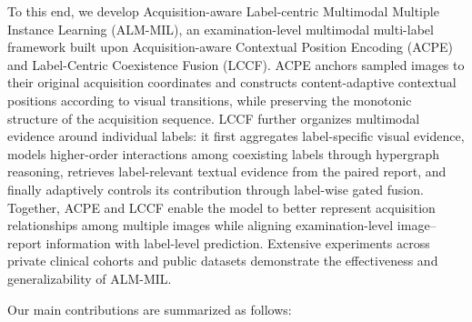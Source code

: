  To this end, we develop Acquisition-aware Label-centric Multimodal Multiple Instance Learning (ALM-MIL), an examination-level multimodal multi-label framework built upon Acquisition-aware Contextual Position Encoding (ACPE) and Label-Centric Coexistence Fusion (LCCF). ACPE anchors sampled images to their original acquisition coordinates and constructs content-adaptive contextual positions according to visual transitions, while preserving the monotonic structure of the acquisition sequence. LCCF further organizes multimodal evidence around individual labels: it first aggregates label-specific visual evidence, models higher-order interactions among coexisting labels through hypergraph reasoning, retrieves label-relevant textual evidence from the paired report, and finally adaptively controls its contribution through label-wise gated fusion. Together, ACPE and LCCF enable the model to better represent acquisition relationships among multiple images while aligning examination-level image–report information with label-level prediction. Extensive experiments across private clinical cohorts and public datasets demonstrate the effectiveness and generalizability of ALM-MIL.


Our main contributions are summarized as follows:


